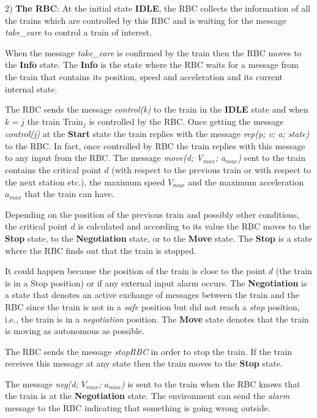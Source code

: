\documentclass{template/openetcs_article}
\begin{document}
2) \textbf{The RBC}: At the initial state \textbf{IDLE}, the RBC collects the information of all the trains which are controlled by this RBC and is waiting for the message \textit{take\_care} to control a train of interest.
 
When the message \textit{take\_care} is confirmed by the train then the RBC moves to the \textbf{Info} state. The \textbf{Info} is the state where the RBC waits for a message from the train that contains its position, speed and acceleration and its current internal state. 

The RBC sends the message \textit{control(k)} to the train in the \textbf{IDLE} state and when $k = j$ the train Train$_j$ is controlled by the RBC. Once getting the message \textit{control(j)} at the \textbf{Start} state the train replies with the message \textit{rep(p; v; a; state)} to the RBC. In fact, once controlled by RBC the train replies with this message to any input from the RBC. The message \textit{move(d; V$_{max}$; a$_{max}$)} sent to the train contains the critical point $d$ (with respect to the previous train or with respect to the next station etc.), the maximum speed $V_{max}$ and the maximum acceleration $a_{max}$ that the train can have. 

Depending on the position of the previous train and possibly other conditions, the critical point $d$ is calculated and according to its value the RBC moves to the \textbf{Stop} state, to the \textbf{Negotiation} state, or to the \textbf{Move} state. The \textbf{Stop} is a state where the RBC finds out that the train is stopped.

It could happen because the position of the train is close to the point $d$ (the train is in a Stop position) or if any external input alarm occurs. The \textbf{Negotiation} is a state that denotes an active exchange of messages between the train and the RBC since the train is not in a \textit{safe} position but did not reach a \textit{stop} position, i.e., the train is in a \textit{negotiation} position. The \textbf{Move} state denotes that the train is moving as autonomous as possible.

The RBC sends the message \textit{stopRBC} in order to stop the train. If the train receives this message at any state then the train moves to the \textbf{Stop} state. 

The message \textit{neg(d; $V_{max}$; $a_{max}$)} is sent to the train when the RBC knows that the train is at the \textbf{Negotiation} state. The environment can send the \textit{alarm} message to the RBC indicating that something is going wrong outside. 
\end{document}
